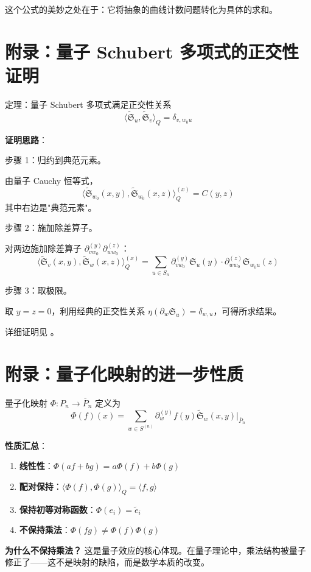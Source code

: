 这个公式的美妙之处在于：它将抽象的曲线计数问题转化为具体的求和。

\section{附录：量子 Schubert 多项式的正交性证明}
\label{sec:orthogonality-proof}

定理：量子 Schubert 多项式满足正交性关系
$$\langle \widetilde{\mathfrak{S}}_u, \widetilde{\mathfrak{S}}_v \rangle_Q = \delta_{v, w_0 u}$$

\textbf{证明思路}：

步骤 1：归约到典范元素。

由量子 Cauchy 恒等式，
$$\langle \widetilde{\mathfrak{S}}_{w_0}(x,y), \widetilde{\mathfrak{S}}_{w_0}(x,z) \rangle_Q^{(x)} = C(y,z)$$
其中右边是"典范元素"。

步骤 2：施加除差算子。

对两边施加除差算子 $\partial_{vw_0}^{(y)} \partial_{ww_0}^{(z)}$：
$$\langle \widetilde{\mathfrak{S}}_v(x,y), \widetilde{\mathfrak{S}}_w(x,z) \rangle_Q^{(x)} = \sum_{u \in S_n} \partial_{vw_0}^{(y)} \mathfrak{S}_u(y) \cdot \partial_{ww_0}^{(z)} \mathfrak{S}_{w_0 u}(z)$$

步骤 3：取极限。

取 $y=z=0$，利用经典的正交性关系 $\eta(\partial_w \mathfrak{S}_u) = \delta_{w,u}$，可得所求结果。

详细证明见 \cite[ Section 5]{KM}。

\section{附录：量子化映射的进一步性质}
\label{sec:quantization-further}

量子化映射 $\Phi: P_n \to \overline{P}_n$ 定义为
$$\Phi(f)(x) = \sum_{w \in S^{(n)}} \partial_w^{(y)} f(y) \widetilde{\mathfrak{S}}_w(x,y) \big|_{\overline{P}_n}$$

\textbf{性质汇总}：

\begin{enumerate}
\item \textbf{线性性}：$\Phi(af + bg) = a\Phi(f) + b\Phi(g)$
\item \textbf{配对保持}：$\langle \Phi(f), \Phi(g) \rangle_Q = \langle f, g \rangle$
\item \textbf{保持初等对称函数}：$\Phi(e_i) = \widetilde{e}_i$
\item \textbf{不保持乘法}：$\Phi(fg) \neq \Phi(f) \Phi(g)$
\end{enumerate}

\textbf{为什么不保持乘法？} 这是量子效应的核心体现。在量子理论中，乘法结构被量子修正了——这不是映射的缺陷，而是数学本质的改变。

\endinput
